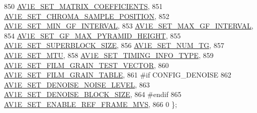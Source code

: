 \begin{DoxyCodeInclude}
{{{{{{{850                                         \hyperlink{group__aom__encoder_ggae78dde67a6d78f332e9bdba0dde42db5a0111ed659d2cd11827ac5cd1f3d774b0}{AV1E\_SET\_MATRIX\_COEFFICIENTS},
851                                         \hyperlink{group__aom__encoder_ggae78dde67a6d78f332e9bdba0dde42db5abc5bb5cf57ba1a1193a0593225e881ff}{AV1E\_SET\_CHROMA\_SAMPLE\_POSITION},
852                                         \hyperlink{group__aom__encoder_ggae78dde67a6d78f332e9bdba0dde42db5a31bcfcb7057884ceb831146c90086ddd}{AV1E\_SET\_MIN\_GF\_INTERVAL},
853                                         \hyperlink{group__aom__encoder_ggae78dde67a6d78f332e9bdba0dde42db5a0355cea227ab76f9bd77028a39bbfca8}{AV1E\_SET\_MAX\_GF\_INTERVAL},
854                                         \hyperlink{group__aom__encoder_ggae78dde67a6d78f332e9bdba0dde42db5a685f831a5a5d08f9b5a14209d55ac129}{AV1E\_SET\_GF\_MAX\_PYRAMID\_HEIGHT},
855                                         \hyperlink{group__aom__encoder_ggae78dde67a6d78f332e9bdba0dde42db5a8854a06c62269e866d6bac0f3a2e3dc2}{AV1E\_SET\_SUPERBLOCK\_SIZE},
856                                         \hyperlink{group__aom__encoder_ggae78dde67a6d78f332e9bdba0dde42db5a9ac0044ad63e6848a482db04f0858c44}{AV1E\_SET\_NUM\_TG},
857                                         \hyperlink{group__aom__encoder_ggae78dde67a6d78f332e9bdba0dde42db5a353037d84b6c47ac0138fa843b70a2bb}{AV1E\_SET\_MTU},
858                                         \hyperlink{group__aom__encoder_ggae78dde67a6d78f332e9bdba0dde42db5a857e822046c62a4c774b1d16c4e453dd}{AV1E\_SET\_TIMING\_INFO\_TYPE},
859                                         \hyperlink{group__aom__encoder_ggae78dde67a6d78f332e9bdba0dde42db5a437e6b282a2395b4b08a9acde3e41cfb}{AV1E\_SET\_FILM\_GRAIN\_TEST\_VECTOR},
860                                         \hyperlink{group__aom__encoder_ggae78dde67a6d78f332e9bdba0dde42db5ad5846c6f49d37e65a03c39e68d487097}{AV1E\_SET\_FILM\_GRAIN\_TABLE},
861 \textcolor{preprocessor}{#if CONFIG\_DENOISE}
862                                         \hyperlink{group__aom__encoder_ggae78dde67a6d78f332e9bdba0dde42db5a54fe460f126a7566aa627cd82826faf0}{AV1E\_SET\_DENOISE\_NOISE\_LEVEL},
863                                         \hyperlink{group__aom__encoder_ggae78dde67a6d78f332e9bdba0dde42db5ae113c7e68a6c39b872a268ed6cdf6d10}{AV1E\_SET\_DENOISE\_BLOCK\_SIZE},
864 \textcolor{preprocessor}{#endif}
865                                         \hyperlink{group__aom__encoder_ggae78dde67a6d78f332e9bdba0dde42db5a5e82346d8463bf758967abb0d03ebc88}{AV1E\_SET\_ENABLE\_REF\_FRAME\_MVS},
866                                         0 \};
}}}}}}}
\end{DoxyCodeInclude}
